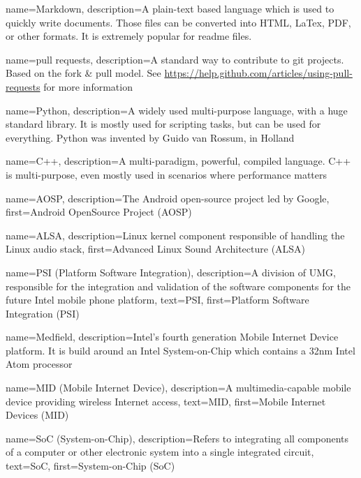 {
  name=Markdown,
  description={A plain-text based language which is used to quickly write documents.
  Those files can be converted into HTML, LaTex, PDF, or other formats.
  It is extremely popular for readme files.}
}

{
  name=pull requests,
  description={A standard way to contribute to git projects. Based on the fork \& pull model.
  See \url{https://help.github.com/articles/using-pull-requests} for more information}
}

{
  name=Python,
  description={A widely used multi-purpose language, with a huge standard library.
  It is mostly used for scripting tasks, but can be used for everything.
  Python was invented by Guido van Rossum, in Holland}
}

{
  name=C++,
  description={A multi-paradigm, powerful, compiled language. C++ is multi-purpose, even mostly used
  in scenarios where performance matters}
}

{
  name=AOSP,
  description={The Android open-source project led by Google},
  first=Android OpenSource Project (AOSP)
}

{
  name=ALSA,
  description={Linux kernel component responsible of handling the Linux audio stack},
  first=Advanced Linux Sound Architecture (ALSA)
}

{
  name=PSI (Platform Software Integration),
  description={A division of UMG, responsible for the integration and
    validation of the software components for the future Intel mobile
    phone platform},
  text=PSI,
  first=Platform Software Integration (PSI)
}

{
  name=Medfield,
  description={Intel's fourth generation Mobile Internet Device
    platform. It is build around an Intel System-on-Chip which
    contains a 32nm Intel Atom\textsuperscript{\texttrademark}
    processor}
}

{
  name=MID (Mobile Internet Device),
  description={A multimedia-capable mobile device providing wireless
    Internet access},
  text=MID,
  first=Mobile Internet Devices (MID)
}

{
  name=SoC (System-on-Chip),
  description={Refers to integrating all components of a computer or
    other electronic system into a single integrated circuit},
  text=SoC,
  first=System-on-Chip (SoC)
}

